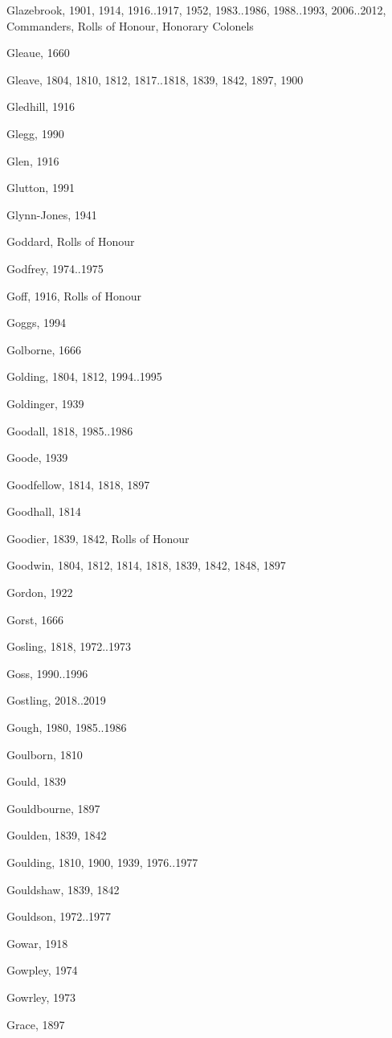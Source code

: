 {\begin{theindex}
\item Glazebrook, 1901, 1914, 1916..1917, 1952, 1983..1986, 1988..1993, 2006..2012, Commanders, Rolls of Honour, Honorary Colonels
\item Gleaue, 1660
\item Gleave, 1804, 1810, 1812, 1817..1818, 1839, 1842, 1897, 1900
\item Gledhill, 1916
\item Glegg, 1990
\item Glen, 1916
\item Glutton, 1991
\item Glynn-Jones, 1941
\item Goddard, Rolls of Honour
\item Godfrey, 1974..1975
\item Goff, 1916, Rolls of Honour
\item Goggs, 1994
\item Golborne, 1666
\item Golding, 1804, 1812, 1994..1995
\item Goldinger, 1939
\item Goodall, 1818, 1985..1986
\item Goode, 1939
\item Goodfellow, 1814, 1818, 1897
\item Goodhall, 1814
\item Goodier, 1839, 1842, Rolls of Honour
\item Goodwin, 1804, 1812, 1814, 1818, 1839, 1842, 1848, 1897
\item Gordon, 1922
\item Gorst, 1666
\item Gosling, 1818, 1972..1973
\item Goss, 1990..1996
\item Gostling, 2018..2019
\item Gough, 1980, 1985..1986
\item Goulborn, 1810
\item Gould, 1839
\item Gouldbourne, 1897
\item Goulden, 1839, 1842
\item Goulding, 1810, 1900, 1939, 1976..1977
\item Gouldshaw, 1839, 1842
\item Gouldson, 1972..1977
\item Gowar, 1918
\item Gowpley, 1974
\item Gowrley, 1973
\item Grace, 1897

\end{theindex}}
